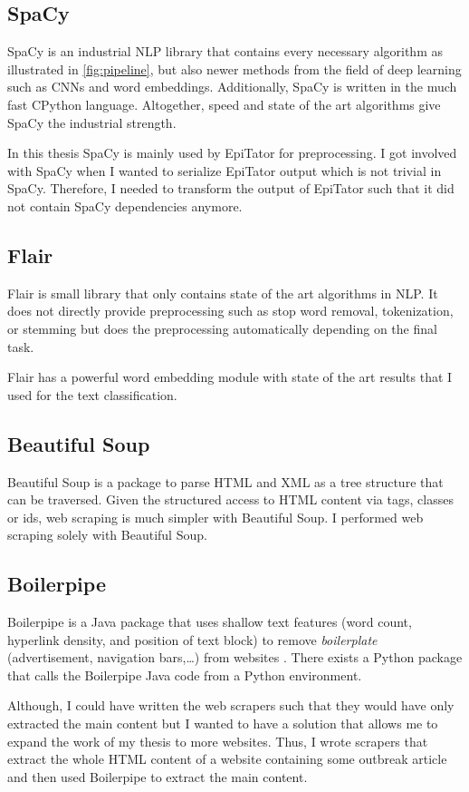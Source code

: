 \subsection{SpaCy}
SpaCy is an industrial NLP library that contains every necessary algorithm as illustrated in \ref{fig:pipeline}, but also newer methods from the field of deep learning such as CNNs and word embeddings. Additionally, SpaCy is written in the much fast CPython language. Altogether, speed and state of the art algorithms give SpaCy the industrial strength.

In this thesis SpaCy is mainly used by EpiTator for preprocessing. I got involved with SpaCy when I wanted to serialize EpiTator output which is not trivial in SpaCy. Therefore, I needed to transform the output of EpiTator such that it did not contain SpaCy dependencies anymore.

\subsection{Flair}
Flair is small library that only contains state of the art algorithms in NLP. It does not directly provide preprocessing such as stop word removal, tokenization, or stemming but does the preprocessing automatically depending on the final task.

Flair has a powerful word embedding module with state of the art results that I used for the text classification.

\subsection{Beautiful Soup}
Beautiful Soup is a package to parse HTML and XML as a tree structure that can be traversed. Given the structured access to HTML content via tags, classes or ids, web scraping is much simpler with Beautiful Soup.
I performed web scraping solely with Beautiful Soup.

\subsection{Boilerpipe}
Boilerpipe is a Java package that uses shallow text features (word count, hyperlink density, and position of text block) to remove \textsl{boilerplate} (advertisement, navigation bars,\dots) from websites \citep{Kohlschutter2010}. There exists a Python package that calls the Boilerpipe Java code from a Python environment.

Although, I could have written the web scrapers such that they would have only extracted the main content but I wanted to have a solution that allows me to expand the work of my thesis to more websites. Thus, I wrote scrapers that extract the whole HTML content of a website containing some outbreak article and then used Boilerpipe to extract the main content.

